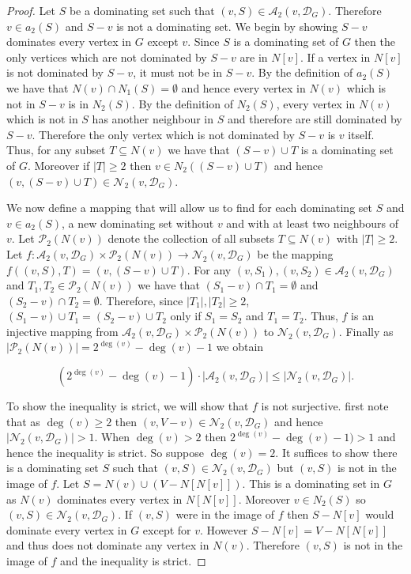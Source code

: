 \documentclass[11pt]{article}
\newcommand{\A}[3][\mathcal{D}_G]{\mathcal{A}_{#3}(#2, #1)}
\newcommand{\N}[3][\mathcal{D}_G]{\mathcal{N}_{#3}(#2, #1)}
\begin{document}
\begin{proof}
Let $S$ be a dominating set such that $(v,S) \in \A{v}{2}$. Therefore $v \in a_2(S)$ and $S-v$ is not a dominating set. We begin by showing $S-v$ dominates every vertex in $G$ except $v$. Since $S$ is a dominating set of $G$ then the only vertices which are not dominated by $S-v$ are in $N[v]$. If a vertex in $N[v]$ is not dominated by $S-v$, it must not be in $S-v$. By the definition of $a_2(S)$ we have that $N(v)\cap N_1(S)= \emptyset$ and hence every vertex in $N(v)$ which is not in $S-v$ is in $N_2(S)$. By the definition of $N_2(S)$, every vertex in $N(v)$ which is not in $S$ has another neighbour in $S$ and therefore are still dominated by $S-v$. Therefore the only vertex which is not dominated by $S-v$ is $v$ itself. Thus, for any subset $T \subseteq N(v)$ we have that $(S-v) \cup T$ is a dominating set of $G$. Moreover if $|T| \geq 2$ then $v \in N_2((S-v) \cup T)$ and hence $(v, (S-v) \cup T) \in \N{v}{2}$. 

We now define a mapping that will allow us to find for each dominating set $S$ and $v\in a_2(S)$, a new dominating set without $v$ and with at least two neighbours of $v$. Let $\mathcal{P}_2( N(v))$ denote the collection of all subsets $T \subseteq N(v)$ with $|T|\geq 2$.  Let $f:\A{v}{2} \times \mathcal{P}_2( N(v)) \rightarrow \N{v}{2}$ be the mapping $f((v, S), T)=(v, (S-v) \cup T)$. For any $(v, S_1), (v, S_{2}) \in \A{v}{2}$ and $T_1, T_2 \in \mathcal{P}_2( N(v))$ we have that $(S_1-v)\cap T_1=\emptyset$ and $(S_2-v)\cap T_2=\emptyset$. Therefore, since $|T_1|,|T_2|\ge 2$, $(S_1-v)\cup T_1=(S_2-v) \cup T_2$ only if $S_1=S_2$ and $T_1=T_2$. Thus, $f$ is an injective mapping from $\A{v}{2} \times \mathcal{P}_2( N(v))$ to $\N{v}{2}$. Finally as $|\mathcal{P}_2( N(v))|=2^{\deg(v)}-\deg(v)-1$ we obtain

$$(2^{\deg(v)}-\deg(v)-1) \cdot |\A{v}{2}| \leq |\N{v}{2}|.$$


To show the inequality is strict, we will show that $f$ is not surjective. first note that as $\deg(v) \geq 2$ then $(v,V-v) \in \N{v}{2}$ and hence $|\N{v}{2}|>1$. When $\deg(v) > 2$ then $2^{\deg(v)}-\deg(v)-1) >1$ and hence the inequality is strict. So suppose $\deg(v) = 2$. It suffices to show there is a dominating set $S$ such that $(v,S) \in \N{v}{2}$ but $(v,S)$ is not in the image of $f$. Let $S=N(v) \cup (V-N[N[v]])$. This is a dominating set in $G$ as $N(v)$ dominates every vertex in $N[N[v]]$. Moreover $v \in N_2(S)$ so $(v,S) \in \N{v}{2}$. If $(v,S)$ were in the image of $f$ then $S-N[v]$ would dominate every vertex in $G$ except for $v$. However $S-N[v]=V-N[N[v]]$ and thus does not dominate any vertex in $N(v)$. Therefore $(v,S)$ is not in the image of $f$ and the inequality is strict.

\end{proof}
\end{document}

